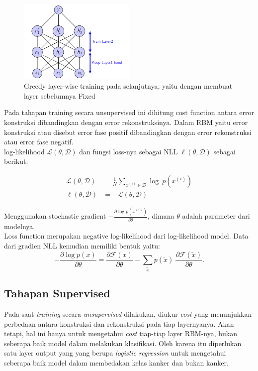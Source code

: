 \begin{figure}
	\centering
	\includegraphics[width=0.5\textwidth]
		{pics/greedy2.png}
	\caption{Greedy layer-wise training pada selanjutnya, yaitu dengan membuat layer sebelumnya Fixed}
	\label{fig:greedy2}
\end{figure}

Pada tahapan training secara unsupervised ini dihitung cost function antara error konstruksi dibandingkan dengan error rekonstruksinya. Dalam RBM yaitu error konstruksi atau disebut error fase positif dibandingkan dengan error rekonstruksi atau error fase negatif.\\
log-likelihood $\mathcal{L}(\theta, \mathcal{D})$ dan fungsi loss-nya sebagai NLL $\ell (\theta, \mathcal{D})$ sebagai berikut:

\begin{equation}
\begin{aligned}
\mathcal{L}(\theta, \mathcal{D}) &= \frac{1}{N} \sum_{x^{(i)} \in
\mathcal{D}} \log\ p(x^{(i)}) \\
\ell (\theta, \mathcal{D}) &= - \mathcal{L} (\theta, \mathcal{D})
\end{aligned}
\end{equation}


Menggunakan stochastic gradient $-\frac{\partial  \log p(x^{(i)})}{\partial
\theta}$, dimana $\theta$ adalah parameter dari modelnya.\\
Loss function merupakan negative log-likelihood dari log-likelihood model. Data dari gradien NLL kemudian memiliki bentuk yaitu:
\begin{equation}
- \frac{\partial  \log p(x)}{\partial \theta}
 = \frac{\partial \mathcal{F}(x)}{\partial \theta} -
       \sum_{\tilde{x}} p(\tilde{x}) \
           \frac{\partial \mathcal{F}(\tilde{x})}{\partial \theta}.
\end{equation}


\subsection{Tahapan Supervised}
Pada saat \textit{training}  secara \textit{unsupervised} dilakukan, diukur \textit{cost} yang menunjukkan perbedaan antara konstruksi dan rekonstruksi pada tiap layernyanya. Akan tetapi, hal ini hanya untuk mengetahui \textit{cost} tiap-tiap layer RBM-nya, bukan seberapa baik model dalam melakukan klasifikasi. Oleh karena itu diperlukan satu layer output yang yang berupa \textit{logistic regression} untuk mengetahui seberapa baik model dalam membedakan kelas kanker dan bukan kanker.

